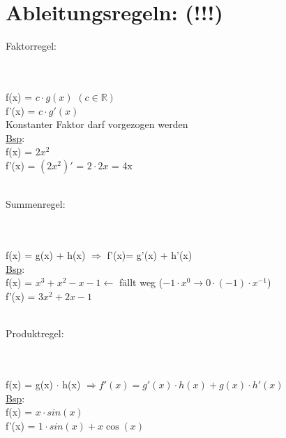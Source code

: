 \documentclass[../mainfile.tex]{subfiles}
\begin{document}
	\section{Ableitungsregeln: (!!!)}
	\begin{enumerate}
		{\large\item[i)] Faktorregel:} \\\\
		f(x) = $c \cdot g(x)$	\qquad	$(c \in \mathbb{R})$ \\
		f'(x) = $c \cdot g'(x)$ \\
		Konstanter Faktor darf vorgezogen werden \\
		\underline{Bsp}: \\ 
		f(x) = $2x^2$ \\
		f'(x) = $(2x^2)'$ = $2 \cdot 2x$ = 4x \\\\
		
		{\large\item[ii)] Summenregel:} \\\\
		f(x) = g(x) + h(x) $\Rightarrow$ f'(x)= g'(x) + h'(x) \\
		\underline{Bsp}: \\ 
		f(x) = $x^3+x^2-x-1 \leftarrow$ fällt weg ($-1 \cdot x^0 \rightarrow 0 \cdot (-1) \cdot x^{-1}$) \\
		f'(x) = $3x^2+2x-1$	\\\\
		
		{\large\item[iii)] Produktregel:} \\\\ 
		f(x) = g(x) $\cdot$ h(x) $\Rightarrow f'(x)= g'(x) \cdot h(x) + g(x) \cdot h'(x)$ \\
		\underline{Bsp}: \\ 
		f(x) = $x \cdot sin(x)$ \\
		f'(x) = $1 \cdot sin(x) + x \cos(x)$
		
	\end{enumerate}
\end{document}
